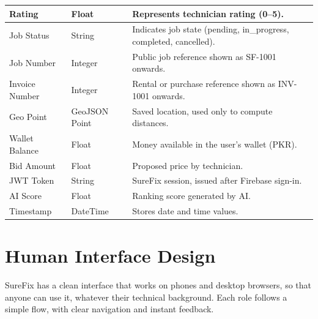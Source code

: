 \documentclass[A4paper,12pt]{report}
\theoremstyle{plain}
\theoremstyle{definition}
\theoremstyle{remark}
\numberwithin{equation}{section}
\begin{document}
\begin{longtable}{|p{}|p{}|p{}|}
Rating & Float & Represents technician rating (0–5). \\ \hline

Job Status & String & Indicates job state (pending, in\_progress, completed, cancelled). \\ \hline

Job Number & Integer & Public job reference shown as SF-1001 onwards. \\ \hline

Invoice Number & Integer & Rental or purchase reference shown as INV-1001 onwards. \\ \hline

Geo Point & GeoJSON Point & Saved location, used only to compute distances. \\ \hline

Wallet Balance & Float & Money available in the user's wallet (PKR). \\ \hline

Bid Amount & Float & Proposed price by technician. \\ \hline

JWT Token & String & SureFix session, issued after Firebase sign-in. \\ \hline

AI Score & Float & Ranking score generated by AI. \\ \hline

Timestamp & DateTime & Stores date and time values. \\ \hline

\end{longtable}

\section{Human Interface Design}

SureFix has a clean interface that works on phones and desktop browsers, so that anyone can use it, whatever their technical background. Each role follows a simple flow, with clear navigation and instant feedback.
\end{document}
